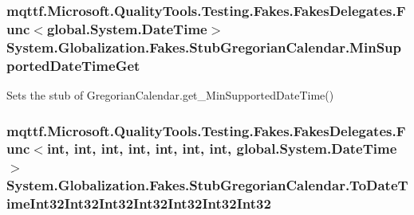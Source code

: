 \hypertarget{class_system_1_1_globalization_1_1_fakes_1_1_stub_gregorian_calendar_ab023a40e3c856bc92220e180fd58a663}{
\subsubsection[{Min\-Supported\-Date\-Time\-Get}]{\setlength{\rightskip}{0pt plus 5cm}mqttf.\-Microsoft.\-Quality\-Tools.\-Testing.\-Fakes.\-Fakes\-Delegates.\-Func$<$global.\-System.\-Date\-Time$>$ System.\-Globalization.\-Fakes.\-Stub\-Gregorian\-Calendar.\-Min\-Supported\-Date\-Time\-Get}}\label{class_system_1_1_globalization_1_1_fakes_1_1_stub_gregorian_calendar_ab023a40e3c856bc92220e180fd58a663}


Sets the stub of Gregorian\-Calendar.\-get\-\_\-\-Min\-Supported\-Date\-Time()

\hypertarget{class_system_1_1_globalization_1_1_fakes_1_1_stub_gregorian_calendar_affc2bfa6292b0cd67f842bf5ce42a9e0}{
\subsubsection[{To\-Date\-Time\-Int32\-Int32\-Int32\-Int32\-Int32\-Int32\-Int32}]{\setlength{\rightskip}{0pt plus 5cm}mqttf.\-Microsoft.\-Quality\-Tools.\-Testing.\-Fakes.\-Fakes\-Delegates.\-Func$<$int, int, int, int, int, int, int, global.\-System.\-Date\-Time$>$ System.\-Globalization.\-Fakes.\-Stub\-Gregorian\-Calendar.\-To\-Date\-Time\-Int32\-Int32\-Int32\-Int32\-Int32\-Int32\-Int32}}\label{class_system_1_1_globalization_1_1_fakes_1_1_stub_gregorian_calendar_affc2bfa6292b0cd67f842bf5ce42a9e0}


